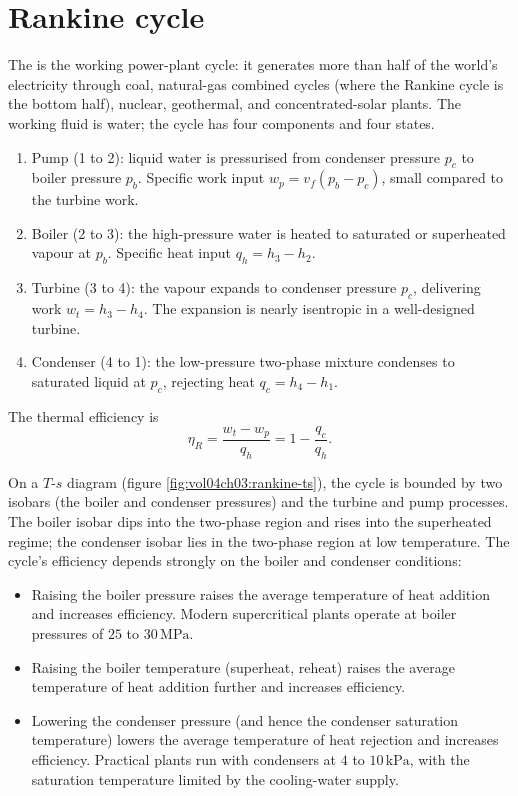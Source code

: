 \section{Rankine cycle}

The  is the working power-plant cycle: it
generates more than half of the world's electricity through coal,
natural-gas combined cycles (where the Rankine cycle is the bottom
half), nuclear, geothermal, and concentrated-solar plants. The
working fluid is water; the cycle has four components and four
states.

\begin{enumerate}[leftmargin=*]
  \item Pump (1 to 2): liquid water is pressurised from condenser
    pressure $p_c$ to boiler pressure $p_b$. Specific work input
    $w_p = v_f(p_b - p_c)$, small compared to the turbine work.
  \item Boiler (2 to 3): the high-pressure water is heated to
    saturated or superheated vapour at $p_b$. Specific heat input
    $q_h = h_3 - h_2$.
  \item Turbine (3 to 4): the vapour expands to condenser pressure
    $p_c$, delivering work $w_t = h_3 - h_4$. The expansion is
    nearly isentropic in a well-designed turbine.
  \item Condenser (4 to 1): the low-pressure two-phase mixture
    condenses to saturated liquid at $p_c$, rejecting heat $q_c =
    h_4 - h_1$.
\end{enumerate}

The thermal efficiency is
\[
\eta_R = \frac{w_t - w_p}{q_h} = 1 - \frac{q_c}{q_h}.
\]



On a $T$-$s$ diagram (figure \ref{fig:vol04ch03:rankine-ts}), the cycle
is bounded by two isobars (the boiler
and condenser pressures) and the turbine and pump processes. The
boiler isobar dips into the two-phase region and rises into the
superheated regime; the condenser isobar lies in the two-phase region
at low temperature. The cycle's efficiency depends strongly on the
boiler and condenser conditions:

\begin{itemize}[leftmargin=*]
  \item Raising the boiler pressure raises the average temperature
    of heat addition and increases efficiency. Modern supercritical
    plants operate at boiler pressures of $25$ to $30\,\text{MPa}$.
  \item Raising the boiler temperature (superheat, reheat) raises the
    average temperature of heat addition further and increases
    efficiency.
  \item Lowering the condenser pressure (and hence the condenser
    saturation temperature) lowers the average temperature of heat
    rejection and increases efficiency. Practical plants run with
    condensers at $4$ to $10\,\text{kPa}$, with the saturation
    temperature limited by the cooling-water supply.
\end{itemize}

